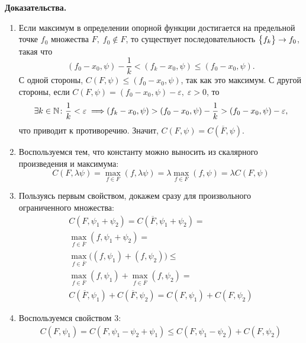 \textbf{Доказательства.}
\begin{enumerate}
    \item Если максимум в определении опорной функции достигается на предельной точке $f_0$ множества $F, \; f_0 \notin F$, 
    то существует последовательность $\bigl\{ f_k \bigr\} \to f_0$, такая что 
    \begin{equation*}
        (f_0 - x_0, \psi) - \frac{1}{k} < (f_k - x_0, \psi) \leqslant (f_0 - x_0, \psi).
    \end{equation*}
    С одной стороны, $C(F, \psi) \leqslant (f_0 - x_0, \psi)$, так как это максимум.
    С другой стороны, если $C(F, \psi) = (f_0 - x_0, \psi) - \varepsilon, \; \varepsilon > 0$, то 
    \begin{equation*}
        \exists k \in \mathbb{N}\colon \frac{1}{k} < \varepsilon \implies \\ (f_k - x_0, \psi) > (f_0 - x_0, \psi) - \frac{1}{k} > (f_0 - x_0, \psi) - \varepsilon,
    \end{equation*}
    что приводит к противоречию.
    Значит, $C(F, \psi) = C(\overline{F}, \psi)$.
    \item Воспользуемся тем, что константу можно выносить из скалярного произведения и максимума:
        \begin{equation*}
            C(F, \lambda \psi) = \max\limits_{f \in F}(f, \lambda \psi) = 
            \lambda \max\limits_{f \in F} (f, \psi) = \lambda C(F, \psi)
        \end{equation*}
    \item Пользуясь первым свойством, докажем сразу для произвольного ограниченного множества:
        \begin{gather*}
            C(F, \psi_1 + \psi_2) = C(\overline{F}, \psi_1 + \psi_2) = \\
            \max\limits_{f \in \overline{F}}(f, \psi_1 + \psi_2) = \\
            \max\limits_{f \in \overline{F}} \bigl( (f, \psi_1) + (f, \psi_2) \bigr) \leqslant \\
            \max\limits_{f \in \overline{F}} (f, \psi_1) + \max\limits_{f \in \overline{F}} (f, \psi_2) = \\
            C(\overline{F}, \psi_1) + C(\overline{F}, \psi_2) = C(F, \psi_1) + C(F, \psi_2)
        \end{gather*}
    \item Воспользуемся свойством 3:
    \begin{gather*}
        C(F, \psi_1) = C(F, \psi_1 - \psi_2 + \psi_1) \leqslant C(F, \psi_1 - \psi_2) + C(F, \psi_2) \\

\end{gather*}
\end{enumerate}
